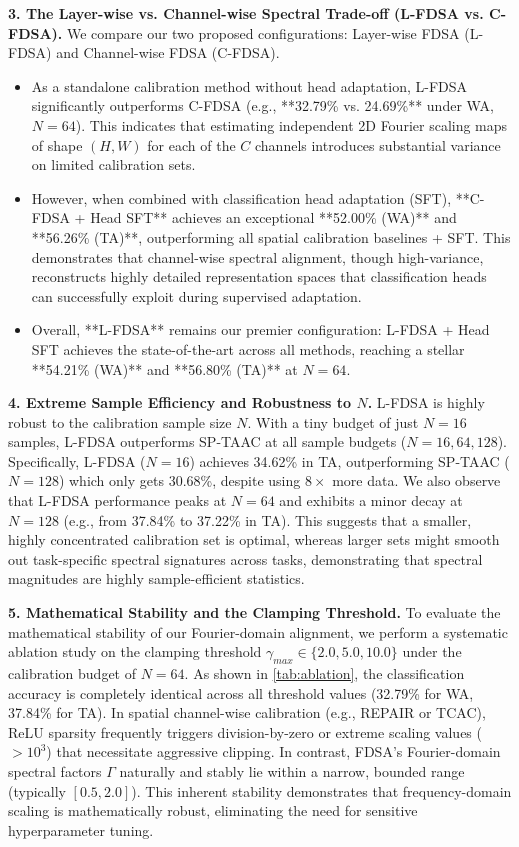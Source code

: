 \documentclass{article}
\begin{document}
\textbf{3. The Layer-wise vs. Channel-wise Spectral Trade-off (L-FDSA vs. C-FDSA).}
We compare our two proposed configurations: Layer-wise FDSA (L-FDSA) and Channel-wise FDSA (C-FDSA). 
\begin{itemize}
    \item As a standalone calibration method without head adaptation, L-FDSA significantly outperforms C-FDSA (e.g., **32.79\% vs. 24.69\%** under WA, $N=64$). This indicates that estimating independent 2D Fourier scaling maps of shape $(H, W)$ for each of the $C$ channels introduces substantial variance on limited calibration sets.
    \item However, when combined with classification head adaptation (SFT), **C-FDSA + Head SFT** achieves an exceptional **52.00\% (WA)** and **56.26\% (TA)**, outperforming all spatial calibration baselines + SFT. This demonstrates that channel-wise spectral alignment, though high-variance, reconstructs highly detailed representation spaces that classification heads can successfully exploit during supervised adaptation.
    \item Overall, **L-FDSA** remains our premier configuration: L-FDSA + Head SFT achieves the state-of-the-art across all methods, reaching a stellar **54.21\% (WA)** and **56.80\% (TA)** at $N=64$.
\end{itemize}

\textbf{4. Extreme Sample Efficiency and Robustness to $N$.}
L-FDSA is highly robust to the calibration sample size $N$. With a tiny budget of just $N=16$ samples, L-FDSA outperforms SP-TAAC at all sample budgets ($N=16, 64, 128$). Specifically, L-FDSA ($N=16$) achieves 34.62\% in TA, outperforming SP-TAAC ($N=128$) which only gets 30.68\%, despite using $8\times$ more data. 
We also observe that L-FDSA performance peaks at $N=64$ and exhibits a minor decay at $N=128$ (e.g., from 37.84\% to 37.22\% in TA). This suggests that a smaller, highly concentrated calibration set is optimal, whereas larger sets might smooth out task-specific spectral signatures across tasks, demonstrating that spectral magnitudes are highly sample-efficient statistics.

\textbf{5. Mathematical Stability and the Clamping Threshold.}
To evaluate the mathematical stability of our Fourier-domain alignment, we perform a systematic ablation study on the clamping threshold $\gamma_{max} \in \{2.0, 5.0, 10.0\}$ under the calibration budget of $N=64$. As shown in \cref{tab:ablation}, the classification accuracy is completely identical across all threshold values (32.79\% for WA, 37.84\% for TA). 
In spatial channel-wise calibration (e.g., REPAIR or TCAC), ReLU sparsity frequently triggers division-by-zero or extreme scaling values ($>10^3$) that necessitate aggressive clipping. In contrast, FDSA's Fourier-domain spectral factors $\Gamma$ naturally and stably lie within a narrow, bounded range (typically $[0.5, 2.0]$). This inherent stability demonstrates that frequency-domain scaling is mathematically robust, eliminating the need for sensitive hyperparameter tuning.
\end{document}
